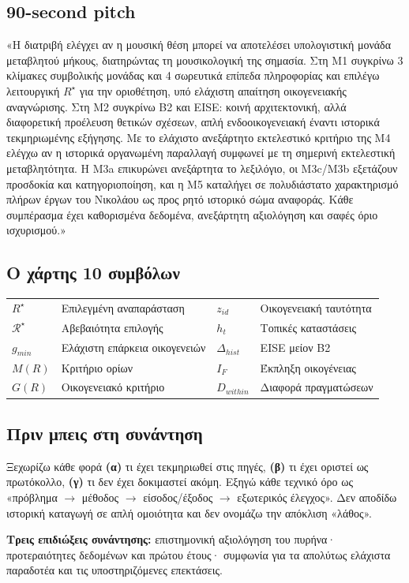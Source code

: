 \documentclass[9pt,a4paper]{extarticle}
\begin{document}
\subsection*{90-second pitch}
\begin{keybox}
«Η διατριβή ελέγχει αν η μουσική θέση μπορεί να αποτελέσει υπολογιστική μονάδα μεταβλητού μήκους, διατηρώντας τη μουσικολογική της σημασία. Στη M1 συγκρίνω 3 κλίμακες συμβολικής μονάδας και 4 σωρευτικά επίπεδα πληροφορίας και επιλέγω λειτουργική \(R^\star\) για την οριοθέτηση, υπό ελάχιστη απαίτηση οικογενειακής αναγνώρισης. Στη M2 συγκρίνω B2 και EISE: κοινή αρχιτεκτονική, αλλά διαφορετική προέλευση θετικών σχέσεων, απλή ενδοοικογενειακή έναντι ιστορικά τεκμηριωμένης εξήγησης. Με το ελάχιστο ανεξάρτητο εκτελεστικό κριτήριο της M4 ελέγχω αν η ιστορικά οργανωμένη παραλλαγή συμφωνεί με τη σημερινή εκτελεστική μεταβλητότητα. Η M3a επικυρώνει ανεξάρτητα το λεξιλόγιο, οι M3c/M3b εξετάζουν προσδοκία και κατηγοριοποίηση, και η M5 καταλήγει σε πολυδιάστατο χαρακτηρισμό πλήρων έργων του Νικολάου ως προς ρητό ιστορικό σώμα αναφοράς. Κάθε συμπέρασμα έχει καθορισμένα δεδομένα, ανεξάρτητη αξιολόγηση και σαφές όριο ισχυρισμού.»
\end{keybox}
\subsection*{Ο χάρτης 10 συμβόλων}
\begin{tabularx}{\linewidth}{>{\bfseries}p{2.3cm}X>{\bfseries}p{2.5cm}X}
\(R^\star\) & Επιλεγμένη αναπαράσταση & \(z_{id}\) & Οικογενειακή ταυτότητα\\
\(\mathcal R^\star\) & Αβεβαιότητα επιλογής & \(h_t\) & Τοπικές καταστάσεις\\
\(g_{min}\) & Ελάχιστη επάρκεια οικογενειών & \(\Delta_{hist}\) & EISE μείον B2\\
\(M(R)\) & Κριτήριο ορίων & \(I_F\) & Έκπληξη οικογένειας\\
\(G(R)\) & Οικογενειακό κριτήριο & \(D_{within}\) & Διαφορά πραγματώσεων\\
\end{tabularx}
\subsection*{Πριν μπεις στη συνάντηση}
Ξεχωρίζω κάθε φορά \textbf{(α)} τι έχει τεκμηριωθεί στις πηγές, \textbf{(β)} τι έχει οριστεί ως πρωτόκολλο, \textbf{(γ)} τι δεν έχει δοκιμαστεί ακόμη. Εξηγώ κάθε τεχνικό όρο ως «πρόβλημα \(\rightarrow\) μέθοδος \(\rightarrow\) είσοδος/έξοδος \(\rightarrow\) εξωτερικός έλεγχος». Δεν αποδίδω ιστορική καταγωγή σε απλή ομοιότητα και δεν ονομάζω την απόκλιση «λάθος». 
\begin{warnbox}
\textbf{Τρεις επιδιώξεις συνάντησης:} επιστημονική αξιολόγηση του πυρήνα· προτεραιότητες δεδομένων και πρώτου έτους· συμφωνία για τα απολύτως ελάχιστα παραδοτέα και τις υποστηριζόμενες επεκτάσεις.
\end{warnbox}
\newpage
\end{document}
